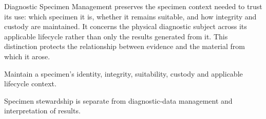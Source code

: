 Diagnostic Specimen Management preserves the specimen context needed to trust its use: which specimen it is, whether it remains suitable, and how integrity and custody are maintained. It concerns the physical diagnostic subject across its applicable lifecycle rather than only the results generated from it. This distinction protects the relationship between evidence and the material from which it arose.



Maintain a specimen’s identity, integrity, suitability, custody and applicable lifecycle context.



Specimen stewardship is separate from diagnostic-data management and interpretation of results.


